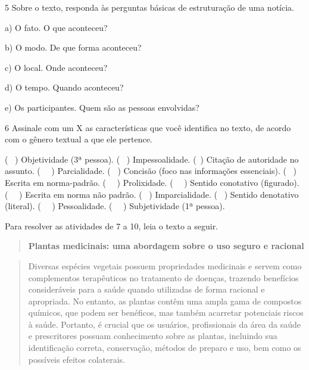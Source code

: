 \num{5} Sobre o texto, responda às perguntas básicas de estruturação de
uma notícia.

a) O fato. O que aconteceu? 


b) O modo. De que forma aconteceu? 


c) O local. Onde aconteceu? 


d) O tempo. Quando aconteceu? 


e) Os participantes. Quem são as pessoas envolvidas? 


\num{6} Assinale com um X as características que você identifica no
texto, de acordo com o gênero textual a que ele pertence.

\begin{boxlist}
\boxitem (~ ) Objetividade (3ª pessoa). 
\boxitem (~ ) Impessoalidade.
\boxitem (~) Citação de autoridade no assunto. 
\boxitem (~~ ) Parcialidade. 
\boxitem (~ ) Concisão (foco nas informações essenciais). 
\boxitem (~ ) Escrita em norma-padrão. 
\boxitem (~~ ) Prolixidade.
\boxitem (~~ ) Sentido conotativo (figurado).
\boxitem (~~ ) Escrita em norma não padrão. 
\boxitem (~ )
Imparcialidade.
\boxitem (~ ) Sentido denotativo (literal).
\boxitem (~~ ) Pessoalidade.
\boxitem (~~ ) Subjetividade (1ª pessoa).
\end{boxlist}

Para resolver as atividades de 7 a 10, leia o texto a seguir.

\begin{quote}
\textbf{Plantas medicinais: uma abordagem sobre o uso seguro e racional}
\end{quote}

\begin{quote}
Diversas espécies vegetais possuem propriedades medicinais e servem como
complementos terapêuticos no tratamento de doenças, trazendo benefícios
consideráveis para a saúde quando utilizadas de forma racional e
apropriada. No entanto, as plantas contêm uma ampla gama de compostos
químicos, que podem ser benéficos, mas também acarretar potenciais
riscos à saúde. Portanto, é crucial que os usuários, profissionais da
área da saúde e prescritores possuam conhecimento sobre as plantas,
incluindo sua identificação correta, conservação, métodos de preparo e
uso, bem como os possíveis efeitos colaterais.
\end{quote}

